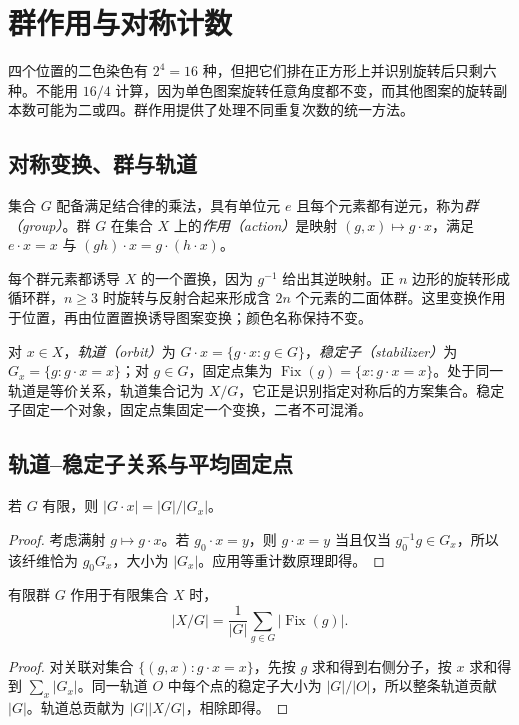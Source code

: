 \setcounter{chapter}{11} %
\chapter{群作用与对称计数}
\label{ch:symmetry}

四个位置的二色染色有 $2^4=16$ 种，但把它们排在正方形上并识别旋转后只剩六种。不能用 $16/4$ 计算，因为单色图案旋转任意角度都不变，而其他图案的旋转副本数可能为二或四。群作用提供了处理不同重复次数的统一方法。

\section{对称变换、群与轨道}

\begin{definition}
集合 $G$ 配备满足结合律的乘法，具有单位元 $e$ 且每个元素都有逆元，称为\emph{群（group）}。群 $G$ 在集合 $X$ 上的\emph{作用（action）}是映射 $(g,x)\mapsto g\cdot x$，满足 $e\cdot x=x$ 与 $(gh)\cdot x=g\cdot(h\cdot x)$。
\end{definition}

每个群元素都诱导 $X$ 的一个置换，因为 $g^{-1}$ 给出其逆映射。正 $n$ 边形的旋转形成循环群，$n\ge3$ 时旋转与反射合起来形成含 $2n$ 个元素的二面体群。这里变换作用于位置，再由位置置换诱导图案变换；颜色名称保持不变。

对 $x\in X$，\emph{轨道（orbit）}为 $G\cdot x=\{g\cdot x:g\in G\}$，\emph{稳定子（stabilizer）}为 $G_x=\{g:g\cdot x=x\}$；对 $g\in G$，固定点集为 $\operatorname{Fix}(g)=\{x:g\cdot x=x\}$。处于同一轨道是等价关系，轨道集合记为 $X/G$，它正是识别指定对称后的方案集合。稳定子固定一个对象，固定点集固定一个变换，二者不可混淆。

\section{轨道--稳定子关系与平均固定点}

\begin{proposition}
若 $G$ 有限，则 $|G\cdot x|=|G|/|G_x|$。
\end{proposition}
\begin{proof}
考虑满射 $g\mapsto g\cdot x$。若 $g_0\cdot x=y$，则 $g\cdot x=y$ 当且仅当 $g_0^{-1}g\in G_x$，所以该纤维恰为 $g_0G_x$，大小为 $|G_x|$。应用等重计数原理即得。
\end{proof}

\begin{theorem}[Burnside 引理]
有限群 $G$ 作用于有限集合 $X$ 时，
\begin{equation}
 |X/G|=\frac1{|G|}\sum_{g\in G}|\operatorname{Fix}(g)|.
 \label{eq:burnside}
\end{equation}
\end{theorem}
\begin{proof}
对关联对集合 $\{(g,x):g\cdot x=x\}$，先按 $g$ 求和得到右侧分子，按 $x$ 求和得到 $\sum_x|G_x|$。同一轨道 $O$ 中每个点的稳定子大小为 $|G|/|O|$，所以整条轨道贡献 $|G|$。轨道总贡献为 $|G||X/G|$，相除即得。
\end{proof}

